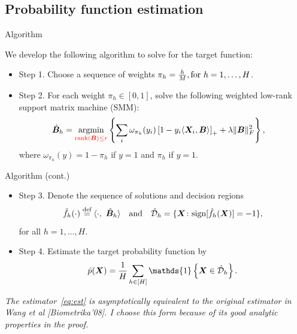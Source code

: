 \documentclass[compress,dvipsnames]{beamer}
\let\olditem\item
\renewcommand\item{\olditem\justifying}
\begin{document}
\subsection{Probability function estimation}
\begin{frame}{Algorithm}

We develop the following algorithm to solve for the target function: 
\begin{itemize}
\item Step 1. Choose a sequence of weights $\pi_h = {h\over M}, \text{for }h=1,\ldots,H$.
\item Step 2. For each weight $\pi_h\in[0,1]$, solve the following {\color{red}weighted low-rank support matrix machine (SMM)}:
\begin{align}\label{eq:sequence}
\hat {\bm{B}}_h&=\operatorname*{argmin}_{{\color{red}\text{rank}(\bm{B})\leq r}} \left\{\sum_{i}\omega_{\pi_h}(y_i)\left[1-y_i\langle \bm{X}_i,\bm{B} \rangle\right]_++\lambda\lVert\bm{B}\rVert_F^2\right\},
\end{align}
\vspace{-2cm}
where $\omega_{\pi_h}(y) = 1-\pi_h$ if $y = 1$ and $\pi_h$ if $y =1$.
\end{itemize}
\end{frame}

\begin{frame}{Algorithm (cont.)}
\begin{itemize}
\item Step 3. Denote the sequence of solutions and decision regions
\[
\hat f_h (\cdot)\stackrel{\text{def}}{=}\langle \cdot,\ \hat {\bm{B}}_h \rangle \quad \text{and}\quad \hat {{\mathcal D}}_h=\{\bm{X}\colon\text{sign}[\hat f_h(\bm{X})] = -1 \},
\]
for all $h=1,\ldots,H$.
\item Step 4. Estimate the target probability function by
\begin{align}\label{eq:est}
\hat p(\mX)={1\over H} \sum_{h\in[H]} \mathds{1}\left\{\mX\in \hat \tD_h \right\}.
\end{align}

\end{itemize}
{\scriptsize \it The estimator~\eqref{eq:est} is asymptotically equivalent to the original estimator in Wang et al [Biometrika'08]. I choose this form because of its good analytic properties in the proof.}

\end{frame}
\end{document}
